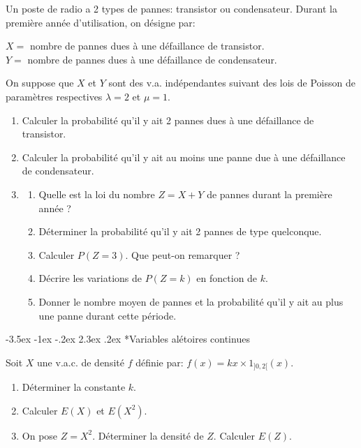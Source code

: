 \documentclass[]{book}
\makeatletter
\renewcommand\section{\@startsection {section}{1}{\z@}%
                                   {-3.5ex \@plus -1ex \@minus -.2ex}%
                                   {2.3ex \@plus.2ex}%
                                   {\normalfont\Large\bfseries\color{ForestGreen}}}
\theoremstyle{magentacolor}
\theoremstyle{proprie}
\theoremstyle{exstyle}
\theoremstyle{exostyle}
\theoremstyle{definition}
\theoremstyle{definition}
\theoremstyle{definition}
\theoremstyle{remark}
\let\BeginKnitrBlock\begin \let\EndKnitrBlock\end
\makeatother
\begin{document}
\BeginKnitrBlock{exercise}
\protect\hypertarget{exr:unnamed-chunk-77}{}{\label{exr:unnamed-chunk-77} }Un poste de radio a 2 types de pannes: transistor ou condensateur.
Durant la première année d'utilisation, on désigne par:

\(X=\) nombre de pannes dues à une défaillance de transistor.\\
\(Y=\) nombre de pannes dues à une défaillance de condensateur.

On suppose que \(X\) et \(Y\) sont des v.a. indépendantes suivant des lois
de Poisson de paramètres respectives \(\lambda=2\) et \(\mu=1\).

\begin{enumerate}
\def\labelenumi{\arabic{enumi}.}
\item
  Calculer la probabilité qu'il y ait 2 pannes dues à une défaillance
  de transistor.
\item
  Calculer la probabilité qu'il y ait au moins une panne due à une
  défaillance de condensateur.
\item
  \begin{enumerate}
  \def\labelenumii{\arabic{enumii}.}
  \item
    Quelle est la loi du nombre \(Z=X+Y\) de pannes durant la première
    année ?
  \item
    Déterminer la probabilité qu'il y ait 2 pannes de type
    quelconque.
  \item
    Calculer \(P(Z=3)\). Que peut-on remarquer ?
  \item
    Décrire les variations de \(P(Z=k)\) en fonction de \(k\).
  \item
    Donner le nombre moyen de pannes et la probabilité qu'il y ait
    au plus une panne durant cette période.
  \end{enumerate}
\end{enumerate}
\EndKnitrBlock{exercise}

\hypertarget{variables-aletoires-continues}{%
\section*{Variables alétoires continues}\label{variables-aletoires-continues}}

\BeginKnitrBlock{exercise}
\protect\hypertarget{exr:unnamed-chunk-78}{}{\label{exr:unnamed-chunk-78} }Soit \(X\) une v.a.c. de densité \(f\) définie par:
\(f(x) = k x \times {1}_{]0,2[} (x)\).

\begin{enumerate}
\def\labelenumi{\arabic{enumi}.}
\item
  Déterminer la constante \(k\).
\item
  Calculer \(E(X)\) et \(E(X^2)\).
\item
  On pose \(Z=X^2\). Déterminer la densité de \(Z\). Calculer \(E(Z)\).
\end{enumerate}
\EndKnitrBlock{exercise}
\end{document}
